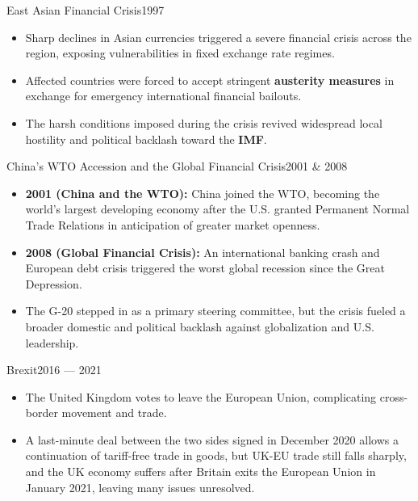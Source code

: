 \documentclass[10pt, aspectratio=169]{beamer}
\begin{document}
	\begin{frame}{East Asian Financial Crisis}{1997}
		\begin{itemize}
			\item Sharp declines in Asian currencies triggered a severe financial crisis across the region, exposing vulnerabilities in fixed exchange rate regimes.
			\vspace{0.25cm}
			\item Affected countries were forced to accept stringent \textbf{austerity measures} in exchange for emergency international financial bailouts.
			\vspace{0.25cm}
			\item The harsh conditions imposed during the crisis revived widespread local hostility and political backlash toward the \textbf{IMF}.
		\end{itemize}
	\end{frame}
	
	\begin{frame}{China's WTO Accession and the Global Financial Crisis}{2001 \& 2008}
		\begin{itemize}
			\item \textbf{2001 (China and the WTO):} China joined the WTO, becoming the world's largest developing economy after the U.S. granted Permanent Normal Trade Relations in anticipation of greater market openness.
			\vspace{0.25cm}
			\item \textbf{2008 (Global Financial Crisis):} An international banking crash and European debt crisis triggered the worst global recession since the Great Depression.
			\vspace{0.25cm}
			\item The G-20 stepped in as a primary steering committee, but the crisis fueled a broader domestic and political backlash against globalization and U.S. leadership.
		\end{itemize}
	\end{frame}
	
	\begin{frame}{Brexit}{2016 — 2021}
		\begin{itemize}
			\item The United Kingdom votes to leave the European Union, complicating cross-border movement and trade.
			\vspace{0.25cm}
			\item A last-minute deal between the two sides signed in December 2020 allows a continuation of tariff-free trade in goods, but UK-EU trade still falls sharply, and the UK economy suffers after Britain exits the European Union in January 2021, leaving many issues unresolved.
		\end{itemize}
	\end{frame}
	
\end{document}
